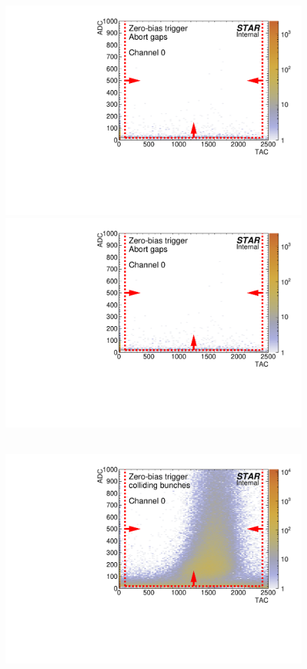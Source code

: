 \begin{figure}[hb]
{  \includegraphics[width=\linewidth,page=47]{graphics/eventSelection/bbc/Bbc_ADCvsTAC_abortGaps.pdf}\\
  \includegraphics[width=\linewidth,page=48]{graphics/eventSelection/bbc/Bbc_ADCvsTAC_abortGaps.pdf}
}~
\parbox{0.327\textwidth}{
  \centering
  \includegraphics[width=\linewidth,page=44]{graphics/eventSelection/bbc/Bbc_ADCvsTAC_collidingBunches.pdf}\\
}
\end{figure}
